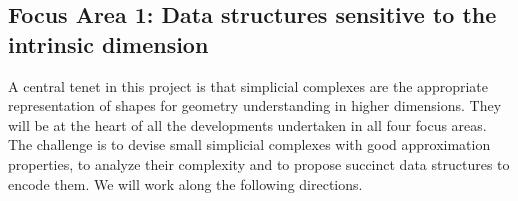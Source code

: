 \subsection*{Focus Area 1:  Data structures sensitive to the intrinsic dimension} 

A central tenet in this project is that simplicial complexes are the appropriate representation of shapes for geometry understanding in higher dimensions.  They will be at the heart of all the developments undertaken in all four focus areas.  The challenge is to devise small simplicial complexes with good approximation properties, to analyze their complexity and to propose succinct data structures to encode them. We will work along the following directions.






